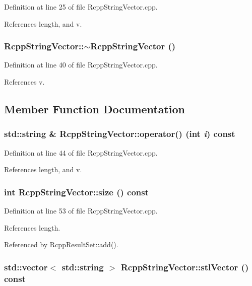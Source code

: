 Definition at line 25 of file RcppStringVector.cpp.

References length, and v.\hypertarget{classRcppStringVector_a1b0550e206ac6945b00ee02c3c4bf373}{
\subsubsection[{$\sim$RcppStringVector}]{\setlength{\rightskip}{0pt plus 5cm}RcppStringVector::$\sim$RcppStringVector ()}}
\label{classRcppStringVector_a1b0550e206ac6945b00ee02c3c4bf373}


Definition at line 40 of file RcppStringVector.cpp.

References v.

\subsection{Member Function Documentation}
\hypertarget{classRcppStringVector_ab735b7a963eed91b60dbb3c6a4fc0d72}{
\subsubsection[{operator()}]{\setlength{\rightskip}{0pt plus 5cm}std::string \& RcppStringVector::operator() (int {\em i}) const}}
\label{classRcppStringVector_ab735b7a963eed91b60dbb3c6a4fc0d72}


Definition at line 44 of file RcppStringVector.cpp.

References length, and v.\hypertarget{classRcppStringVector_ada1580e213b9bcde60397bffd7607ae0}{
\subsubsection[{size}]{\setlength{\rightskip}{0pt plus 5cm}int RcppStringVector::size () const}}
\label{classRcppStringVector_ada1580e213b9bcde60397bffd7607ae0}


Definition at line 53 of file RcppStringVector.cpp.

References length.

Referenced by RcppResultSet::add().\hypertarget{classRcppStringVector_a2cd7003720e2900b1c53ffe47205bc75}{
\subsubsection[{stlVector}]{\setlength{\rightskip}{0pt plus 5cm}std::vector$<$ std::string $>$ RcppStringVector::stlVector () const}}
\label{classRcppStringVector_a2cd7003720e2900b1c53ffe47205bc75}


